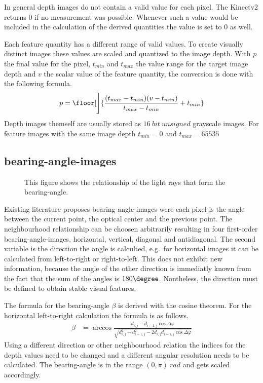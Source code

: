 In general depth images do not contain a valid value for each pixel.
The Kinectv2 returns $0$ if no measurement was possible.
Whenever such a value would be included in the calculation of the derived quantities the value is set to $0$ as well.

Each feature quantity has a different range of valid values.
To create visually distinct images these values are scaled and quantized to the image depth.
With $p$ the final value for the pixel, $t_{min}$ and $t_{max}$ the value range for the target image depth and $v$ the scalar value of the feature quantity, the conversion is done with the following formula.
\begin{align}
    p = \floor[\Bigg]{\frac{{(t_{max} - t_{min})} {(v - t_{min})}}{t_{max} - t_{min}} + t_{min}}
\end{align}
Depth images themself are usually stored as $16~bit~unsigned$ grayscale images.
For feature images with the same image depth $t_{min} = 0$ and $t_{max} = 65535$

\subsection{\Glspl{bearing-angle-image}}

\begin{figure}[H]
    \centering
    \caption[Schematic Representation of Bearing-Angles]{This figure shows the relationship of the light rays that form the \gls{bearing-angle}.}
\end{figure}

Existing literature\cite{Scaramuzza2007,Lin2017} proposes \Glspl{bearing-angle-image} were each pixel is the angle between the current point, the optical center and the previous point.
The neighbourhood relationship can be choosen arbitrarily resulting in four first-order \Glspl{bearing-angle-image}, horizontal, vertical, diagonal and antidiagonal.
The second variable is the direction the angle is calculted, e.g.~for horizontal images it can be calculated from left-to-right or right-to-left.
This does not exhibit new information, because the angle of the other direction is immediatly known from the fact that the sum of the angles is $180\degree$.
Nontheless, the direction must be defined to obtain stable visual features.

The formula for the \gls{bearing-angle} $\beta$ is derived with the cosine theorem.
For the horizontal left-to-right calculation the formula is as follows.
\begin{align}
    \beta&= \arccos%
            \frac{d_{i,j} - d_{i-1,j} \cos \Delta\varphi}%
                 {\sqrt{d_{i,j}^2 + d_{i-1,j}^2 - 2 d_{i,j} d_{i-1,j} \cos \Delta\varphi}}
\end{align}
Using a different direction or other neighbourhood relation the indices for the depth values need to be changed and a different angular resolution needs to be calculated.
The \Gls{bearing-angle} is in the range $(0, \pi)~rad$ and gets scaled accordingly.

